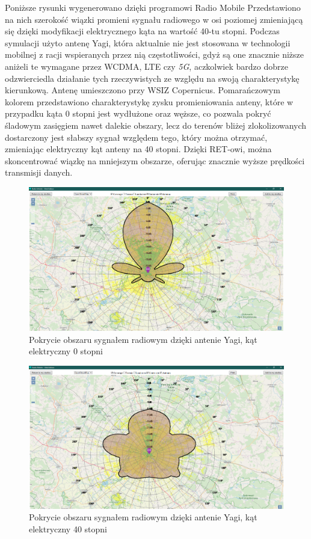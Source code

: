 		Poniższe rysunki wygenerowano dzięki programowi Radio Mobile \autocite{RADIO_MOBILE_PAGE_1}
		Przedstawiono na nich szerokość wiązki promieni sygnału radiowego w osi poziomej \autocite{BEAMWIDTH_1}
		zmieniającą się dzięki modyfikacji elektrycznego kąta na wartość 40-tu stopni.
		Podczas symulacji użyto antenę Yagi, która aktualnie nie jest stosowana w technologii mobilnej z racji wspieranych
		przez nią częstotliwości, gdyż są one znacznie niższe aniżeli te wymagane przez WCDMA, LTE czy \textit{5G}, 
		aczkolwiek bardzo dobrze odzwierciedla działanie tych rzeczywistych ze względu na swoją charakterystykę kierunkową.
		\newline
		Antenę umieszczono przy WSIZ Copernicus. \newline
		Pomarańczowym kolorem przedstawiono charakterystykę zysku promieniowania anteny, które w przypadku kąta 0 stopni jest wydłużone oraz węższe,
		co pozwala pokryć śladowym zasięgiem nawet dalekie obszary, lecz do terenów bliżej zlokolizowanych dostarczony
		jest słabszy sygnał względem tego, który można otrzymać, zmieniając elektryczny kąt anteny na 40 stopni.
		Dzięki RET-owi, można skoncentrować wiązkę na mniejszym obszarze, oferując znacznie wyższe prędkości transmisji danych.

		\begin{figure}[h!]
		\centering
		\includegraphics[scale=0.5]{Obrazki/Antenna_Yagi_Angle_0.png}
		\caption{Pokrycie obszaru sygnałem radiowym dzięki antenie Yagi, kąt elektryczny 0 stopni}
		\end{figure}

		\begin{figure}[h!]
		\centering
		\includegraphics[scale=0.5]{Obrazki/Antenna_Yagi_Angle_40.png}
		\caption{Pokrycie obszaru sygnałem radiowym dzięki antenie Yagi, kąt elektryczny 40 stopni}
		\end{figure}
